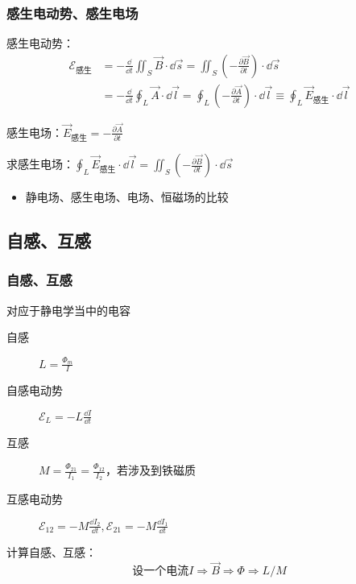 \documentclass{beamer}
\begin{document}
\begin{frame}[c]
    \frametitle{感生电动势、感生电场}
    
    感生电动势：
    $$\begin{aligned}
            \mathcal{E}_{\text{感生}} & =-\frac{\dd}{\dd t}\iint_S\vec{B}\cdot\dd\vec{s}=\iint_S(-\frac{\partial\vec{B}}{\partial t})\cdot\dd\vec{s}                                                \\
                                    & =-\frac{\dd}{\dd t}\oint_L\vec{A}\cdot\dd\vec{l}=\oint_L(-\frac{\partial\vec{A}}{\partial t})\cdot\dd\vec{l}\equiv\oint_L\vec{E}_{\text{感生}}\cdot\dd\vec{l}
        \end{aligned}$$
    
    感生电场：$\vec{E}_{\text{感生}}=-\frac{\partial \vec{A}}{\partial t}$
    
    求感生电场：$\oint_L\vec{E}_{\text{感生}}\cdot\dd\vec{l}=\iint_S(-\frac{\partial\vec{B}}{\partial t})\cdot\dd\vec{s}$
    
    \begin{itemize}
        \item 静电场、感生电场、电场、恒磁场的比较
    \end{itemize}
    
    
\end{frame}

\subsection{自感、互感}

\begin{frame}[c]
    \frametitle{自感、互感}
    
    对应于静电学当中的电容
    
    \begin{description}
        \item[自感] $L=\frac{\Phi_m}{I}$
        \item[自感电动势] $\mathcal{E}_L=-L\frac{\dd I}{\dd t}$
        \item[互感] $M=\frac{\Phi_{21}}{I_1}=\frac{\Phi_{12}}{I_2}$，若涉及到铁磁质
        \item[互感电动势] $\mathcal{E}_{12}=-M\frac{\dd I_2}{\dd t}, \mathcal{E}_{21}=-M\frac{\dd I_1}{\dd t}$
    \end{description}
    计算自感、互感：
    $$\text{设一个电流}I\Rightarrow\vec{B}\Rightarrow\Phi\Rightarrow L/M$$
    
\end{frame}
\end{document}
